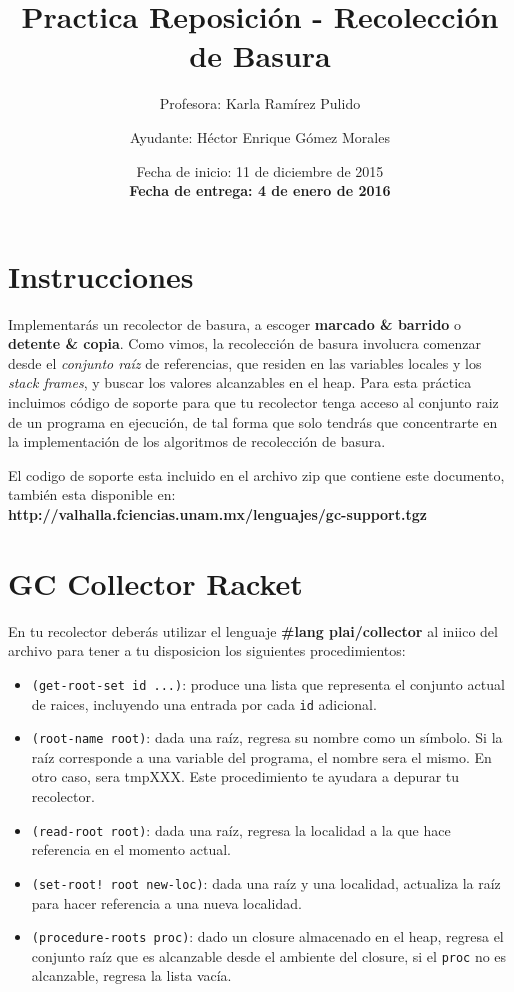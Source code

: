 \documentclass{article}
\author{Profesora: Karla Ramírez Pulido \and
  Ayudante: Héctor Enrique Gómez Morales}
\title{Practica Reposición - Recolección de Basura}
\date{Fecha de inicio: 11 de diciembre de 2015\\
  \textbf{Fecha de entrega: 4 de enero de 2016}}
\begin{document}
\maketitle
\section{Instrucciones}
Implementarás un recolector de basura, a escoger \textbf{marcado & barrido} o \textbf{detente & copia}.
Como vimos, la recolección de basura involucra comenzar desde el \textit{conjunto raíz} de referencias,
que residen en las variables locales y los \textit{stack frames}, y buscar los valores alcanzables en el heap.
Para esta práctica incluimos código de soporte para que tu recolector tenga acceso al conjunto raiz de un
programa en ejecución, de tal forma que solo tendrás que concentrarte en la implementación de los algoritmos de
recolección de basura.

El codigo de soporte esta incluido en el archivo zip que contiene este documento, también esta disponible
en: \textbf{http://valhalla.fciencias.unam.mx/lenguajes/gc-support.tgz}

\section*{GC Collector Racket}
En tu recolector deberás utilizar el lenguaje \textbf{#lang plai/collector} al iniico del archivo
para tener a tu disposicion los siguientes procedimientos:

\begin{itemize}
\item \verb;(get-root-set id ...);: produce una lista que representa el conjunto actual de raices, incluyendo
  una entrada por cada \verb;id; adicional.
\item \verb;(root-name root);: dada una raíz, regresa su nombre como un símbolo. Si la raíz corresponde a una
  variable del programa, el nombre sera el mismo. En otro caso, sera tmpXXX. Este procedimiento te ayudara a
  depurar tu recolector.
\item \verb;(read-root root);: dada una raíz, regresa la localidad a la que hace referencia en el momento
  actual.
\item \verb;(set-root! root new-loc);: dada una raíz y una localidad, actualiza la raíz para hacer referencia
  a una nueva localidad.
\item \verb;(procedure-roots proc);: dado un closure almacenado en el heap, regresa el conjunto raíz que es
  alcanzable desde el ambiente del closure, si el \verb;proc; no es alcanzable, regresa la lista vacía.
\end{itemize}
\end{document}
